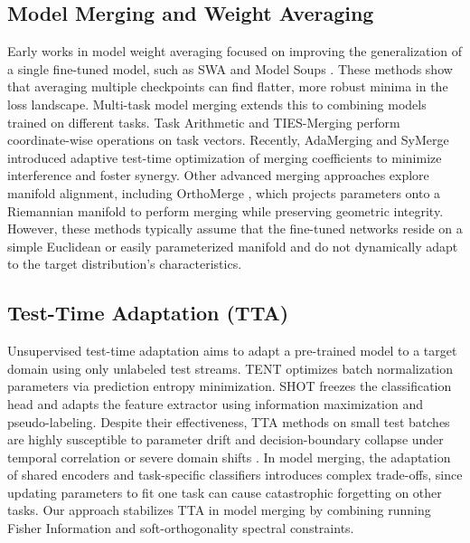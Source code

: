 \documentclass{article}
\begin{document}
\subsection{Model Merging and Weight Averaging}
Early works in model weight averaging focused on improving the generalization of a single fine-tuned model, such as SWA \cite{izmailov18swa} and Model Soups \cite{wortsman22soups}. These methods show that averaging multiple checkpoints can find flatter, more robust minima in the loss landscape. Multi-task model merging extends this to combining models trained on different tasks. Task Arithmetic \cite{ilharco22arithmetic} and TIES-Merging \cite{yadav23ties} perform coordinate-wise operations on task vectors. Recently, AdaMerging \cite{yang24adamerging} and SyMerge \cite{jung26symerge} introduced adaptive test-time optimization of merging coefficients to minimize interference and foster synergy. Other advanced merging approaches explore manifold alignment, including OrthoMerge \cite{sanyal26orthomerge}, which projects parameters onto a Riemannian manifold to perform merging while preserving geometric integrity. However, these methods typically assume that the fine-tuned networks reside on a simple Euclidean or easily parameterized manifold and do not dynamically adapt to the target distribution's characteristics.

\subsection{Test-Time Adaptation (TTA)}
Unsupervised test-time adaptation aims to adapt a pre-trained model to a target domain using only unlabeled test streams. TENT \cite{wang21tent} optimizes batch normalization parameters via prediction entropy minimization. SHOT \cite{liang20shot} freezes the classification head and adapts the feature extractor using information maximization and pseudo-labeling. Despite their effectiveness, TTA methods on small test batches are highly susceptible to parameter drift and decision-boundary collapse under temporal correlation or severe domain shifts \cite{li23survey}. In model merging, the adaptation of shared encoders and task-specific classifiers introduces complex trade-offs, since updating parameters to fit one task can cause catastrophic forgetting on other tasks. Our approach stabilizes TTA in model merging by combining running Fisher Information and soft-orthogonality spectral constraints.
\end{document}
